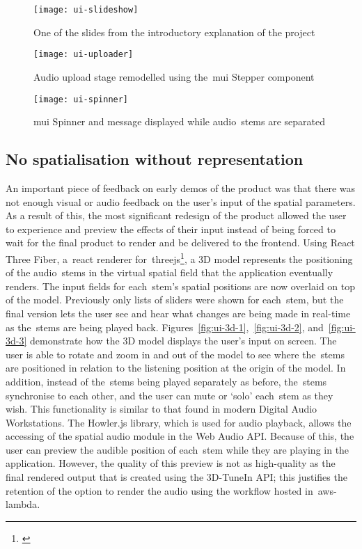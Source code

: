 \begin{figure}[!htb]
    \minipage{\textwidth}
    \texttt{[image: ui-slideshow]}
    \caption{One of the slides from the introductory explanation of the project}\label{fig:ui-slideshow}
    \endminipage\hfill
\end{figure}

\begin{figure}[!htb]
    \minipage{\textwidth}
    \texttt{[image: ui-uploader]}
    \caption{Audio upload stage remodelled using the~\gls{mui} Stepper component}\label{fig:ui-uploader}
    \endminipage\hfill
\end{figure}

\begin{figure}[!htb]
    \minipage{\textwidth}
    \texttt{[image: ui-spinner]}
    \caption{\gls{mui} Spinner and message displayed while audio~\glspl{stem} are separated}\label{fig:ui-spinner}
    \endminipage
\end{figure}

\subsection{No spatialisation without representation}\label{subsec:no-spatialisation-without-representation}
An important piece of feedback on early demos of the product was that there was not enough visual or audio feedback on the user's input of the spatial parameters.
As a result of this,
the most significant redesign of the product allowed the user
to experience and preview the effects of their input
instead of being forced to wait for the final product to render and be delivered to the frontend.
Using React Three Fiber, a~\gls{react} renderer for~\gls{threejs}\footnote{\citep{dirksen2023learn}},
a 3D model represents the positioning of the audio~\glspl{stem} in the virtual spatial field
that the application eventually renders.
The input fields for each~\gls{stem}'s spatial positions are now overlaid on top of the model.
Previously only lists of sliders were shown for each~\gls{stem},
but the final version lets
the user see and hear what changes are being made in real-time as the~\glspl{stem} are being played back.
Figures~\ref{fig:ui-3d-1},~\ref{fig:ui-3d-2},
and~\ref{fig:ui-3d-3} demonstrate how the 3D model displays the user's input on screen.
The user is able
to rotate and zoom in and out of the model
to see where the~\glspl{stem} are positioned in relation to the listening position at the origin of the model.
In addition, instead of the~\glspl{stem} being played separately as before, the~\glspl{stem} synchronise to each other,
and the user can mute or `solo' each~\gls{stem} as they wish.
This functionality is similar to that found in modern Digital Audio Workstations.
The Howler.js library,
which is used for audio playback, allows the accessing of the spatial audio module in the Web Audio API\@.
Because of this, the user can preview the audible position of each~\gls{stem} while they are playing in the application.
However,
the quality of this preview is not as high-quality as the final rendered output that is created using the 3D-TuneIn API\@;
this justifies the retention of the option to render the audio using the workflow hosted in~\gls{aws-lambda}.

